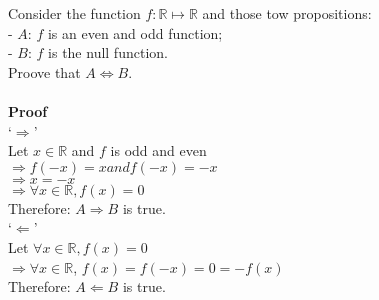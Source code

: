 \documentclass{article}
\begin{document}
\noindent Consider the function $f : \mathbb{R} \mapsto \mathbb{R}$ and those tow propositions:\\
- $A$: $f$ is an even and odd function;\\
- $B$: $f$ is the null function.\\
Proove that $A \iff B$.\\\\
\textbf{Proof}\\
`$\Rightarrow$'\\
Let $x \in \mathbb{R}$ and $f$ is odd and even\\
$\Rightarrow f(-x) = x and f(-x) = -x$\\
$\Rightarrow x = -x$\\
$\Rightarrow \forall x \in \mathbb{R}, f(x) = 0$\\
Therefore: $A \Rightarrow B$ is true.\\
`$\Leftarrow$'\\
Let $\forall x \in \mathbb{R}, f(x) = 0$\\
$\Rightarrow \forall  x \in \mathbb{R}$, $f(x) = f(-x) = 0 = -f(x) $\\
Therefore: $A \Leftarrow B$ is true.\\
\end{document}

